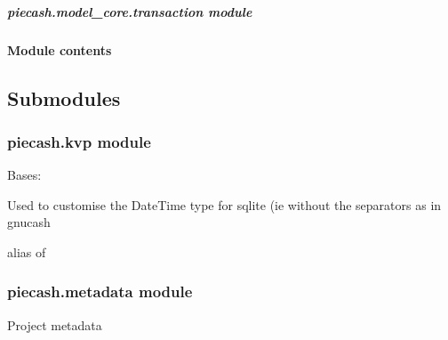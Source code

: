 \documentclass[letterpaper,10pt,english]{sphinxmanual}
\begin{document}
\subparagraph{piecash.model\_core.transaction module}
\label{api/piecash.model_core.transaction::doc}\label{api/piecash.model_core.transaction:module-piecash.model_core.transaction}\label{api/piecash.model_core.transaction:piecash-model-core-transaction-module}

\paragraph{Module contents}
\label{api/piecash.model_core:module-contents}\label{api/piecash.model_core:module-piecash.model_core}

\subsection{Submodules}
\label{api/piecash:submodules}

\subsubsection{piecash.kvp module}
\label{api/piecash.kvp::doc}\label{api/piecash.kvp:module-piecash.kvp}\label{api/piecash.kvp:piecash-kvp-module}

\begin{fulllineitems}
\label{api/piecash.kvp:piecash.kvp.SlotType}
Bases: 

Used to customise the DateTime type for sqlite (ie without the separators as in gnucash

\begin{fulllineitems}
\label{api/piecash.kvp:piecash.kvp.SlotType.impl}
alias of 

\end{fulllineitems}


\end{fulllineitems}



\subsubsection{piecash.metadata module}
\label{api/piecash.metadata::doc}\label{api/piecash.metadata:module-piecash.metadata}\label{api/piecash.metadata:piecash-metadata-module}
Project metadata
\end{document}
